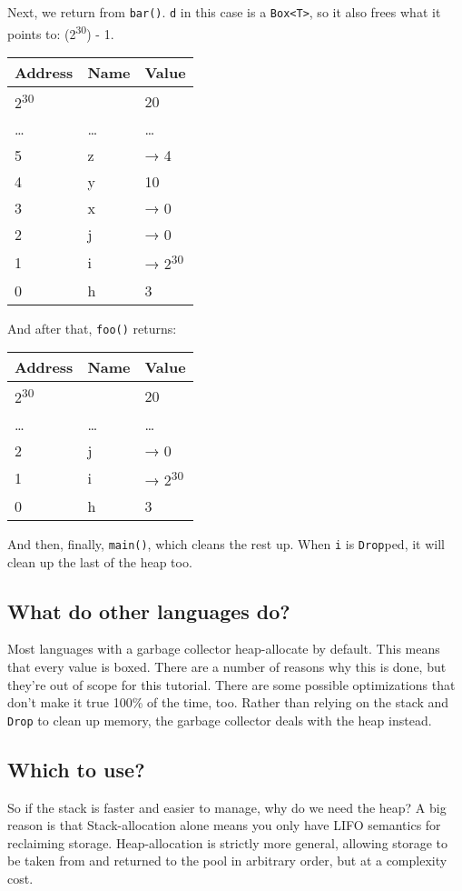 \documentclass[a4paper,]{book}
\begin{document}
Next, we return from \texttt{bar()}. \texttt{d} in this case is a
\texttt{Box\textless{}T\textgreater{}}, so it also frees what it points
to: (2\textsuperscript{30}) - 1.

\begin{longtable}[c]{@{}lll@{}}
\toprule
Address & Name & Value\tabularnewline
\midrule
\endhead
2\textsuperscript{30} & & 20\tabularnewline
\ldots{} & \ldots{} & \ldots{}\tabularnewline
5 & z & → 4\tabularnewline
4 & y & 10\tabularnewline
3 & x & → 0\tabularnewline
2 & j & → 0\tabularnewline
1 & i & → 2\textsuperscript{30}\tabularnewline
0 & h & 3\tabularnewline
\bottomrule
\end{longtable}

And after that, \texttt{foo()} returns:

\begin{longtable}[c]{@{}lll@{}}
\toprule
Address & Name & Value\tabularnewline
\midrule
\endhead
2\textsuperscript{30} & & 20\tabularnewline
\ldots{} & \ldots{} & \ldots{}\tabularnewline
2 & j & → 0\tabularnewline
1 & i & → 2\textsuperscript{30}\tabularnewline
0 & h & 3\tabularnewline
\bottomrule
\end{longtable}

And then, finally, \texttt{main()}, which cleans the rest up. When
\texttt{i} is \texttt{Drop}ped, it will clean up the last of the heap
too.

\subsection{What do other languages
do?}\label{what-do-other-languages-do}

Most languages with a garbage collector heap-allocate by default. This
means that every value is boxed. There are a number of reasons why this
is done, but they're out of scope for this tutorial. There are some
possible optimizations that don't make it true 100\% of the time, too.
Rather than relying on the stack and \texttt{Drop} to clean up memory,
the garbage collector deals with the heap instead.

\subsection{Which to use?}\label{which-to-use}

So if the stack is faster and easier to manage, why do we need the heap?
A big reason is that Stack-allocation alone means you only have LIFO
semantics for reclaiming storage. Heap-allocation is strictly more
general, allowing storage to be taken from and returned to the pool in
arbitrary order, but at a complexity cost.
\end{document}
